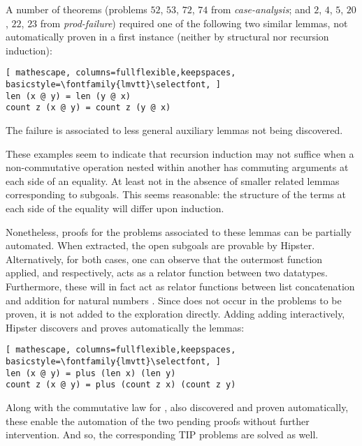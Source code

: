 A number of theorems (problems $52$, $53$, $72$, $74$ from \emph{case-analysis}; and $2$, $4$, $5$, $20$, $22$, $23$ from \emph{prod-failure}) required one of the following two similar lemmas, not automatically proven in a first instance (neither by structural nor recursion induction):

\begin{lstlisting}[ mathescape, columns=fullflexible,keepspaces, basicstyle=\fontfamily{lmvtt}\selectfont, ]
len (x @ y) = len (y @ x)
count z (x @ y) = count z (y @ x)
\end{lstlisting}

\noindent The failure is associated to less general auxiliary lemmas not being discovered. %

These examples seem to indicate that recursion induction may not suffice when a non-commutative operation nested within another has commuting arguments at each side of an equality.
%
At least not in the absence of smaller related lemmas corresponding to subgoals.
%
This seems reasonable: the structure of the terms at each side of the equality will differ upon induction.

Nonetheless, proofs for the problems associated to these lemmas can be partially automated.
%
When extracted, the open subgoals are provable by Hipster.
%
Alternatively, for both cases, one can observe that the outermost function applied,  and  respectively, acts as a relator function between two datatypes.
%
Furthermore, these will in fact act as relator functions between list concatenation  and addition for natural numbers .
%
Since  does not occur in the problems to be proven, it is not added to the exploration directly.
%
Adding adding  interactively, Hipster discovers and proves automatically the lemmas:

\begin{lstlisting}[ mathescape, columns=fullflexible,keepspaces, basicstyle=\fontfamily{lmvtt}\selectfont, ]
len (x @ y) = plus (len x) (len y)
count z (x @ y) = plus (count z x) (count z y)
\end{lstlisting}

\noindent Along with the commutative law for , also discovered and proven automatically, these enable the automation of the two pending proofs without further intervention.
%
And so, the corresponding TIP problems are solved as well.

